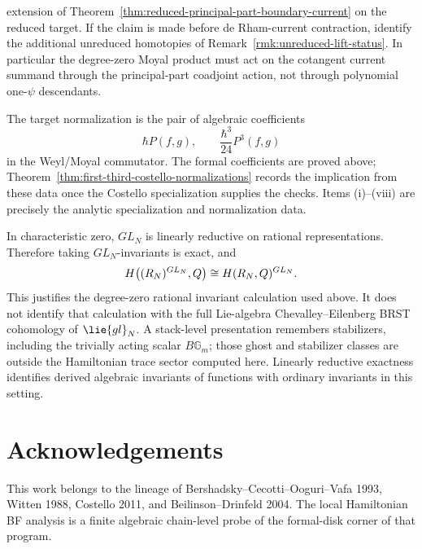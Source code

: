 \documentclass[11pt]{memoir}
\makeatletter
\renewcommand{\thesection}{\arabic{section}}
\renewcommand{\thesubsection}{\thesection.\arabic{subsection}}
\renewcommand{\thesubsubsection}{\thesubsection.\arabic{subsubsection}}
\let\ts@originalappendix\appendix
\renewcommand{\appendix}{%
  \ts@originalappendix
  \setcounter{section}{0}%
  \setcounter{subsection}{0}%
  \setcounter{subsubsection}{0}%
  \renewcommand{\thesection}{\Alph{section}}%
  \renewcommand{\thesubsection}{\thesection.\arabic{subsection}}%
  \renewcommand{\thesubsubsection}{\thesubsection.\arabic{subsubsection}}%
}
\makeatother
\begin{document}
\begin{prob}
\begin{enumerate}
	      extension of
	      Theorem~\ref{thm:reduced-principal-part-boundary-current} on the
	      reduced target. If the claim is made before de Rham-current
	      contraction, identify the additional unreduced homotopies of
	      Remark~\ref{rmk:unreduced-lift-status}. In particular the degree-zero
	      Moyal product must act on the cotangent current summand through the
	      principal-part coadjoint action, not through polynomial one-\(\psi\)
	      descendants.
	  \end{enumerate}
	  The target normalization is the pair of algebraic coefficients
  $$\hbar P(f,g),\qquad \frac{\hbar^3}{24}P^3(f,g)$$
  in the Weyl/Moyal commutator. The formal coefficients are proved above;
  Theorem~\ref{thm:first-third-costello-normalizations} records the implication
	  from these data once the Costello specialization supplies the checks. Items
	  (i)--(viii) are precisely the analytic specialization and normalization
	  data.
\end{prob}

\begin{rmk}
  In characteristic zero, $GL_N$ is linearly reductive on rational
  representations. Therefore taking $GL_N$-invariants is exact, and
  $$H\bigl((R_N)^{GL_N},Q\bigr)\cong H(R_N,Q)^{GL_N}.$$
  This justifies the degree-zero rational invariant calculation used above.
  It does not identify that calculation with the full Lie-algebra
  Chevalley--Eilenberg BRST cohomology of \(\lie{gl}_N\).  A stack-level
  presentation remembers stabilizers, including the trivially acting scalar
  \(B\mathbb G_m\); those ghost and stabilizer classes are outside the
  Hamiltonian trace sector computed here.  Linearly reductive exactness
  identifies derived algebraic invariants of functions with ordinary
  invariants in this setting.
\end{rmk}

\section*{Acknowledgements}
This work belongs to the lineage of Bershadsky--Cecotti--Ooguri--Vafa 1993,
Witten 1988, Costello 2011, and Beilinson--Drinfeld 2004. The local
Hamiltonian BF analysis is a finite algebraic chain-level probe of the
formal-disk corner of that program.

\appendix






\end{document}

